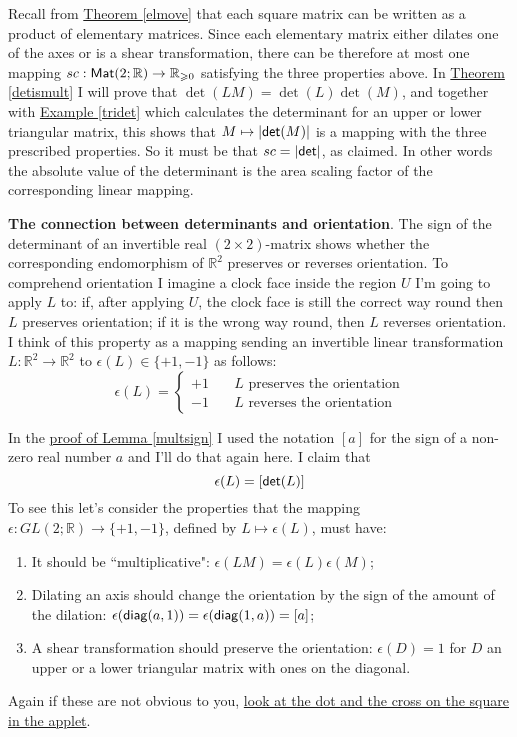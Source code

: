 \documentclass[11pt]{amsbook}
\theoremstyle{definition}
\begin{document}
Recall from \hyperref[elmove]{Theorem \ref{elmove}} that each square matrix can be written as a product of elementary matrices. Since each elementary matrix either dilates one of the axes or is a shear transformation, there can be therefore at most one mapping $sc:  {\sf Mat}(2; \mathbb{R}) \to \mathbb{R}_{\geqslant 0}$ satisfying the three properties above. In \hyperref[detismult]{Theorem \ref{detismult}} I will prove that $\det (LM) = \det(L) \det (M)$, and together with \hyperref[tridet]{Example \ref{tridet}} which calculates the determinant for an upper or lower triangular matrix, this shows that $M\mapsto |{\sf det}(M)|$ is a mapping with the three prescribed properties. So it must be that $sc = |{\sf det}|$, as claimed. In other words the absolute value of the determinant is the area scaling factor of the corresponding linear mapping.
\medskip

\noindent
{\bf The connection between determinants and orientation}. The sign of the determinant of an invertible real $(2\times 2)$-matrix shows whether the corresponding endomorphism of $\mathbb{R}^2$ preserves or reverses orientation. To comprehend orientation I imagine a clock face inside the region $U$ I'm going to apply $L$ to: if, after applying $U$, the clock face is still the correct way round then $L$ preserves orientation; if it is the wrong way round, then $L$ reverses orientation. I think of this property as a mapping sending an invertible linear transformation $L: \mathbb{R}^2 \to \mathbb{R}^2$ to $\epsilon (L) \in \{ +1, -1 \}$ as follows:
$$
\epsilon (L) = \begin{cases} +1 \quad & \text{$L$ preserves the orientation} \\
-1 & \text{$L$ reverses the orientation}
\end{cases}
$$

In the \hyperref[multsign]{proof of Lemma \ref{multsign}} I used the notation $[a]$ for the sign of a non-zero real number $a$ and I'll do that again here.  I claim that $$\epsilon (L) = [{\sf det}(L) ]$$ To see this let's consider the properties that the mapping $\epsilon : GL(2; \mathbb{R}) \to \{ +1, -1\}$, defined by $L\mapsto \epsilon(L)$, must have:
\begin{enumerate}
\item
It should be ``multiplicative": $\epsilon(LM) = \epsilon(L)\epsilon(M)$;
\item
Dilating an axis should change the orientation by the sign of the amount of the dilation: $\epsilon({\sf diag}(a,1)) = \epsilon({\sf diag}(1,a)) = [a]$;
\item
A shear transformation should preserve the orientation: $\epsilon(D) = 1$ for $D$ an upper or a lower triangular matrix with ones on the diagonal.
\end{enumerate}
Again if these are not obvious to you, \href{http://halg.s3-website-eu-west-1.amazonaws.com}{look at the dot and the cross on the square in the applet}.
\end{document}

